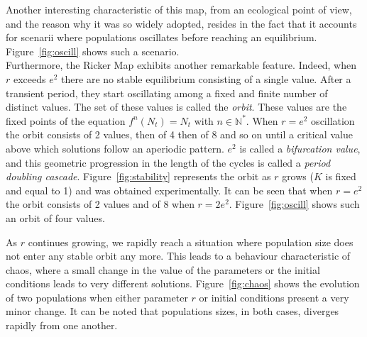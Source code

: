 \documentclass{article}
\begin{document}
	Another interesting characteristic of this map, from an ecological point of view, and the reason why it was so widely adopted, resides in the fact that it accounts for scenarii where populations oscillates before reaching an equilibrium. Figure~\ref{fig:oscill} shows such a scenario.\\
	
	Furthermore, the Ricker Map exhibits another remarkable feature. Indeed, when $r$ exceeds $e^2$ there are no stable equilibrium consisting of a single value. After a transient period, they start oscillating among a fixed and finite number of distinct values. The set of these values is called the \emph{orbit}. These values are the fixed points of the equation $f^n(N_t) = N_t$ with $n \in \mathbb{N^*}$. When $r=e^2$ oscillation the orbit consists of 2 values, then of 4 then of 8 and so on until a critical value above which solutions follow an aperiodic pattern. $e^2$ is called a \emph{bifurcation value}, and this geometric progression in the length of the cycles is called a \emph{period doubling cascade}. Figure~\ref{fig:stability} represents the orbit as $r$ grows ($K$ is fixed and equal to 1) and was obtained experimentally. It can be seen that when $r=e^2$ the orbit consists of 2 values and of 8 when $r=2e^2$. Figure~\ref{fig:oscill} shows such an orbit of four values.
	
	As $r$ continues growing, we rapidly reach a situation where population size does not enter any stable orbit any more. This leads to a behaviour characteristic of chaos, where a small change in the value of the parameters or the initial conditions leads to very different solutions. Figure~\ref{fig:chaos} shows the evolution of two populations when either parameter $r$ or initial conditions present a very minor change. It can be noted that populations sizes, in both cases, diverges rapidly from one another.
	
\end{document}
